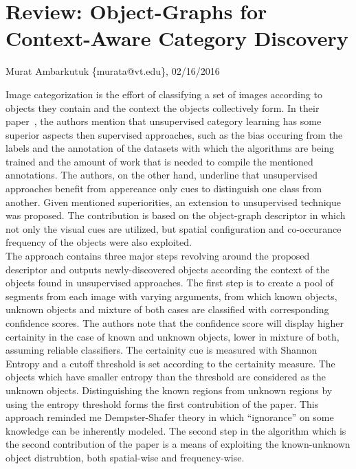 \documentclass[11pt]{article}
\begin{document}
\thispagestyle{empty}
\section*{Review: Object-Graphs for Context-Aware Category Discovery}
\begin{flushright}
	\small{Murat Ambarkutuk \{murata@vt.edu\}, 02/16/2016}
\end{flushright}
Image categorization is the effort of classifying a set of images according to objects they contain and the context the objects collectively form.
In their paper~\cite{lee2012object}, the authors mention that unsupervised category learning has some superior aspects then supervised approaches, such as the bias occuring from the labels and the annotation of the datasets with which the algorithms are being trained and the amount of work that is needed to compile the mentioned annotations.
The authors, on the other hand, underline that unsupervised approaches benefit from appereance only cues to distinguish one class from another.
Given mentioned superiorities, an extension to unsupervised technique was proposed.
The contribution is based on the object-graph descriptor in which not only the visual cues are utilized, but spatial configuration and co-occurance frequency of the objects were also exploited.\@ \\
\indent The approach contains three major steps revolving around the proposed descriptor and outputs newly-discovered objects according the context of the objects found in unsupervised approaches. %
The first step is to create a pool of segments from each image with varying arguments, from which known objects, unknown objects and mixture of both cases are classified with corresponding confidence scores.
The authors note that the confidence score will display higher certainity in the case of known and unknown objects, lower in mixture of both, assuming reliable classifiers.
The certainity cue is measured with Shannon Entropy and a cutoff threshold is set according to the certainity measure.
The objects which have smaller entropy than the threshold are considered as the unknown objects.
Distinguishing the known regions from unknown regions by using the entropy threshold forms the first contrubition of the paper.
This approach reminded me Dempster-Shafer theory in which ``ignorance'' on some knowledge can be inherently modeled.
The second step in the algorithm which is the second contribution of the paper is a means of exploiting the known-unknown object distrubtion, both spatial-wise and frequency-wise.
\end{document}
